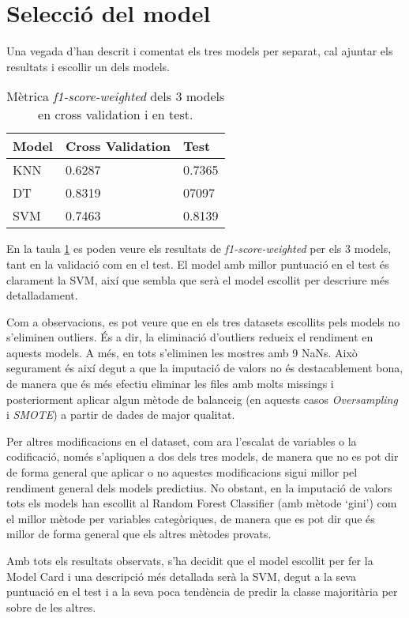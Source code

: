 \section{Selecció del model}
Una vegada d'han descrit i comentat els tres models per separat, cal ajuntar els resultats i escollir un dels models.

\begin{table}[H]
\centering
\begin{tabular}{l|l|l}
\hline
\textbf{Model} & \textbf{Cross Validation} & \textbf{Test} \\
\hline
KNN & 0.6287 & 0.7365 \\
DT & 0.8319 & 07097 \\
SVM & 0.7463 & 0.8139 \\
\hline
\end{tabular}
\caption{Mètrica \textit{f1-score-weighted} dels 3 models en cross validation i en test.}
\label{tab:models-val-test}
\end{table}

En la taula \ref{tab:models-val-test} es poden veure els resultats de \textit{f1-score-weighted} per els 3 models, tant en la validació com en el test. El model amb millor puntuació en el test és clarament la SVM, així que sembla que serà el model escollit per descriure més detalladament.

Com a observacions, es pot veure que en els tres datasets escollits pels models no s'eliminen outliers. És a dir, la eliminació d'outliers redueix el rendiment en aquests models. A més, en tots s'eliminen les mostres amb 9 NaNs. Això segurament és així degut a que la imputació de valors no és destacablement bona, de manera que és més efectiu eliminar les files amb molts missings i posteriorment aplicar algun mètode de balanceig (en aquests casos \textit{Oversampling} i \textit{SMOTE}) a partir de dades de major qualitat.

Per altres modificacions en el dataset, com ara l'escalat de variables o la codificació, només s'apliquen a dos dels tres models, de manera que no es pot dir de forma general que aplicar o no aquestes modificacions sigui millor pel rendiment general dels models predictius. No obstant, en la imputació de valors tots els models han escollit al Random Forest Classifier (amb mètode `gini') com el millor mètode per variables categòriques, de manera que es pot dir que és millor de forma general que els altres mètodes provats.

Amb tots els resultats observats, s'ha decidit que el model escollit per fer la Model Card i una descripció més detallada serà la SVM, degut a la seva puntuació en el test i a la seva poca tendència de predir la classe majoritària per sobre de les altres.

